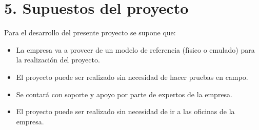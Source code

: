 \section{5. Supuestos del proyecto}
\label{sec:supuestos}

Para el desarrollo del presente proyecto se supone que:

\begin{itemize}
\item La empresa va a proveer de un modelo de referencia (físico o emulado) para la realización del proyecto.
\item El proyecto puede ser realizado sin necesidad de hacer pruebas en campo.
\item Se contará con soporte y apoyo por parte de expertos de la empresa.
\item El proyecto puede ser realizado sin necesidad de ir a las oficinas de la empresa.
\end{itemize}
